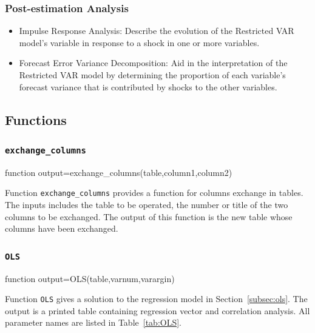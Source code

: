 \documentclass[10pt]{article}
\numberwithin{equation}{section}
\numberwithin{table}{section}
\numberwithin{figure}{section}
\begin{document}
\subsubsection{Post-estimation Analysis}
\begin{itemize}
  \item Impulse Response Analysis: Describe the evolution of the Restricted VAR model’s variable in response to a shock in one or more variables.
  \item Forecast Error Variance Decomposition: Aid in the interpretation of the Restricted VAR model by determining the proportion of each variable’s forecast variance that is contributed by shocks to the other variables.
\end{itemize}


\subsection{Functions}\label{subsec:functions}

\subsubsection{\texttt{exchange\_columns}}\label{func:exchange_columns}

\begin{Code}
function output=exchange_columns(table,column1,column2)
\end{Code}

Function \verb!exchange_columns! provides a function for columns exchange in tables. The inputs includes the table to be operated, the number or title of the two columns to be exchanged. The output of this function is the new table whose columns have been exchanged.

\subsubsection{\texttt{OLS}}\label{func:OLS}\label{subsubsec:OLS}

\begin{Code}
function output=OLS(table,varnum,varargin)
\end{Code}

Function \verb!OLS! gives a solution to the regression model in Section~\ref{subsec:ols}. The output is a printed table containing regression vector and correlation analysis. All parameter names are listed in Table~\ref{tab:OLS}.
\end{document}
